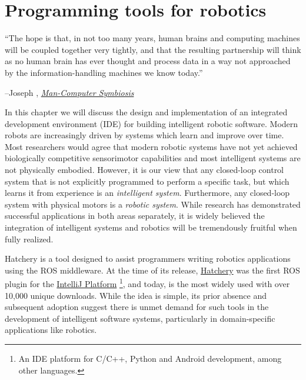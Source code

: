 \chapter{Programming tools for robotics}\label{ch:hatchery}
\setlength{\epigraphwidth}{0.78\textwidth}
\epigraph{``The hope is that, in not too many years, human brains and computing machines will be coupled together very tightly, and that the resulting partnership will think as no human brain has ever thought and process data in a way not approached by the information-handling machines we know today.''}{\begin{flushright}--Joseph \citet{licklider1960man}, \href{https://groups.csail.mit.edu/medg/people/psz/Licklider.html}{\textit{Man-Computer Symbiosis}}\end{flushright}}

In this chapter we will discuss the design and implementation of an integrated development environment (IDE) for building intelligent robotic software. Modern robots are increasingly driven by systems which learn and improve over time. Most researchers would agree that modern robotic systems have not yet achieved biologically competitive sensorimotor capabilities and most intelligent systems are not physically embodied. However, it is our view that any closed-loop control system that is not explicitly programmed to perform a specific task, but which learns it from experience is an \textit{intelligent system}. Furthermore, any closed-loop system with physical motors is a \textit{robotic system}. While research has demonstrated successful applications in both areas separately, it is widely believed the integration of intelligent systems and robotics will be tremendously fruitful when fully realized.

Hatchery is a tool designed to assist programmers writing robotics applications using the ROS middleware. At the time of its release, \href{https://github.com/duckietown/hatchery}{Hatchery} was the first ROS plugin for the \href{https://www.jetbrains.org/intellij/sdk/docs}{IntelliJ Platform} \footnote{An IDE platform for C/C++, Python and Android development, among other languages.}, and today, is the most widely used with over 10,000 unique downloads. While the idea is simple, its prior absence and subsequent adoption suggest there is unmet demand for such tools in the development of intelligent software systems, particularly in domain-specific applications like robotics.
%

